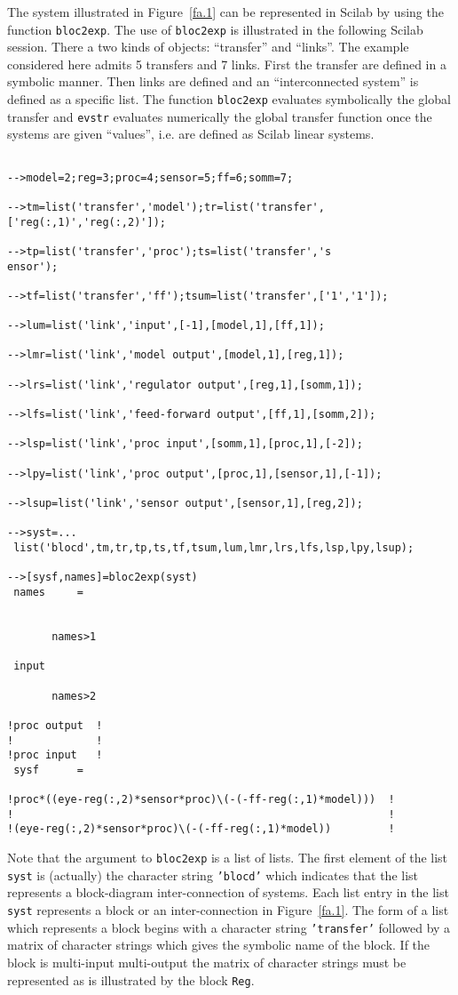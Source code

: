 	The system illustrated in Figure~\ref{fa.1} can
be represented in Scilab by using the function {\tt bloc2exp}.
The use of {\tt bloc2exp} is illustrated in the following Scilab
session.
There a two kinds of objects: ``transfer'' and ``links''. The example
considered here admits 5 transfers and 7 links.
First the transfer are defined in a symbolic manner. Then links
are defined and an ``interconnected system'' is defined as
a specific list. The function {\tt bloc2exp} evaluates symbolically
the global transfer and {\tt evstr} evaluates numerically
the global transfer function once the systems are given ``values'', i.e.
are defined as Scilab linear systems.
%
\begin{verbatim}
 
-->model=2;reg=3;proc=4;sensor=5;ff=6;somm=7;
 
-->tm=list('transfer','model');tr=list('transfer',['reg(:,1)','reg(:,2)']);
 
-->tp=list('transfer','proc');ts=list('transfer','s
ensor');
 
-->tf=list('transfer','ff');tsum=list('transfer',['1','1']);
 
-->lum=list('link','input',[-1],[model,1],[ff,1]);
 
-->lmr=list('link','model output',[model,1],[reg,1]);
 
-->lrs=list('link','regulator output',[reg,1],[somm,1]);
 
-->lfs=list('link','feed-forward output',[ff,1],[somm,2]);
 
-->lsp=list('link','proc input',[somm,1],[proc,1],[-2]);
 
-->lpy=list('link','proc output',[proc,1],[sensor,1],[-1]);
 
-->lsup=list('link','sensor output',[sensor,1],[reg,2]);
 
-->syst=...
 list('blocd',tm,tr,tp,ts,tf,tsum,lum,lmr,lrs,lfs,lsp,lpy,lsup);
 
-->[sysf,names]=bloc2exp(syst)
 names     =
 
 
       names>1
 
 input   
 
       names>2
 
!proc output  !
!             !
!proc input   !
 sysf      =
 
!proc*((eye-reg(:,2)*sensor*proc)\(-(-ff-reg(:,1)*model)))  !
!                                                           !
!(eye-reg(:,2)*sensor*proc)\(-(-ff-reg(:,1)*model))         !
\end{verbatim}
%
Note that the argument to {\tt bloc2exp} is a list of lists.  The 
first element of the list {\tt syst} is (actually) the character string
{\tt 'blocd'} which indicates that the list represents a block-diagram
inter-connection of systems.  Each list entry in the list {\tt syst}
represents a block or an inter-connection in Figure~\ref{fa.1}.
The form of a list which represents a block begins with a character
string {\tt 'transfer'} followed by a matrix of character strings
which gives the symbolic name of the block.  If the block is multi-input
multi-output the matrix of character strings must be represented as
is illustrated by the block {\tt Reg}.  

